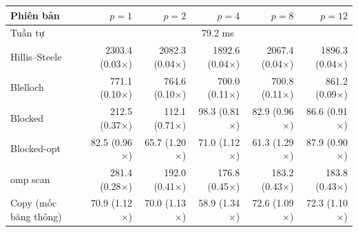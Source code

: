\begin{tabular}{lrrrrr}
\toprule
Phiên bản & $p=1$ & $p=2$ & $p=4$ & $p=8$ & $p=12$ \\
\midrule
Tuần tự & \multicolumn{5}{c}{79.2 ms} \\
\midrule
Hillis–Steele & 2303.4 (0.03$\times$) & 2082.3 (0.04$\times$) & 1892.6 (0.04$\times$) & 2067.4 (0.04$\times$) & 1896.3 (0.04$\times$) \\
Blelloch & 771.1 (0.10$\times$) & 764.6 (0.10$\times$) & 700.0 (0.11$\times$) & 700.8 (0.11$\times$) & 861.2 (0.09$\times$) \\
Blocked & 212.5 (0.37$\times$) & 112.1 (0.71$\times$) & 98.3 (0.81$\times$) & 82.9 (0.96$\times$) & 86.6 (0.91$\times$) \\
Blocked-opt & 82.5 (0.96$\times$) & 65.7 (1.20$\times$) & 71.0 (1.12$\times$) & 61.3 (1.29$\times$) & 87.9 (0.90$\times$) \\
omp scan & 281.4 (0.28$\times$) & 192.0 (0.41$\times$) & 176.8 (0.45$\times$) & 183.2 (0.43$\times$) & 183.8 (0.43$\times$) \\
Copy (mốc băng thông) & 70.9 (1.12$\times$) & 70.0 (1.13$\times$) & 58.9 (1.34$\times$) & 72.6 (1.09$\times$) & 72.3 (1.10$\times$) \\
\bottomrule
\end{tabular}
